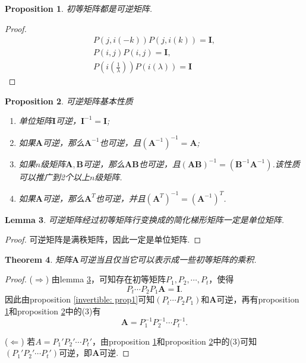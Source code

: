 \documentclass{article}
\newtheorem{theorem}{Theorem}[section]
\newtheorem{lemma}[theorem]{Lemma}
\newtheorem{proposition}[theorem]{Proposition}
\newcommand{\mbf}[1]{\bm{#1}}
\begin{document}
\begin{proposition}\label{invertible: id}
\rm 初等矩阵都是可逆矩阵.
\end{proposition}

\begin{proof}
$$
\begin{array}{ll}
P(j,i(-k))P(j,i(k)) = \mbf{I},\\
P(i,j)P(i,j) = \mbf{I},\\
P(i(\frac{1}{\lambda}))P(i(\lambda)) = \mbf{I} 
\end{array}
$$
\end{proof}

\begin{proposition}\label{invertible: basic}
\rm 可逆矩阵基本性质
\begin{enumerate}
	\item 单位矩阵$\mbf{I}$可逆，$\mbf{I}^{-1} = \mbf{I}$;
	\item 如果$\mbf{A}$可逆，那么$\mbf{A}^{-1}$也可逆，且$(\mbf{A}^{-1})^{-1} = \mbf{A}$;
	\item 如果$n$级矩阵$\mbf{A},\mbf{B}$可逆，那么$\mbf{A}\mbf{B}$也可逆，且$(\mbf{A}\mbf{B})^{-1} = (\mbf{B}^{-1}\mbf{A}^{-1})$.该性质可以推广到2个以上$n$级矩阵. 
	\item 如果$\mbf{A}$可逆，那么$\mbf{A}^{T}$也可逆，并且$(\mbf{A}^T)^{-1} = (\mbf{A}^{-1})^T$.
\end{enumerate}
\end{proposition}

\begin{lemma}\label{invertible: 2id}
\rm 可逆矩阵经过初等矩阵行变换成的简化梯形矩阵一定是单位矩阵.
\end{lemma}

\begin{proof}
可逆矩阵是满秩矩阵，因此一定是单位矩阵.
\end{proof}

\begin{theorem}\label{invertible: decompose}
\rm 矩阵$\mbf{A}$可逆当且仅当它可以表示成一些初等矩阵的乘积.
\end{theorem}

\begin{proof}
($\Rightarrow$) 由lemma \ref{invertible: 2id}，可知存在初等矩阵$P_1,P_2,\cdots,P_t$，使得
$$
P_t\cdots P_2P_1\mbf{A} = \mbf{I}.
$$
因此由proposition \ref{invertible: prop1}可知$(P_t\cdots P_2P_1)$和$\mbf{A}$可逆，再有proposition \ref{invertible: id}和proposition \ref{invertible: basic}中的(3)有
$$
\mbf{A} = P_1^{-1}P_2^{-1}\cdots P_t^{-1}.
$$

($\Leftarrow$) 若$A = P_1'P_2'\cdots P_t'$，由proposition \ref{invertible: id}和proposition \ref{invertible: basic}中的(3)可知$(P_1'P_2'\cdots P_t')$可逆，即$\mbf{A}$可逆.
\end{proof}
\end{document}
